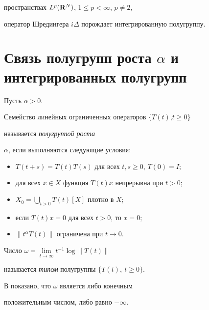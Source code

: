 пространствах $L^p(\bold R^N)$, $1\leq p< \infty$, $p\ne2$,


оператор Шредингера $i\Delta$ порождает интегрированную полугруппу.





\section{Связь полугрупп роста $\alpha$ и интегрированных полугрупп}





\begin{defn}\label{15}


Пусть $\alpha > 0$.


Семейство линейных ограниченных операторов $\{T(t)$,\linebreak $t\geq0 \}$


называется {\it полугруппой роста}


$\alpha$, если выполняются следующие условия:


\begin{itemize}


\item[(T1)] $T(t+s)=T(t)T(s)$ для всех $t,s \geq 0$, $T(0)=I;$ 


\item[(T2)] для всех $x\in X$ функция $T(t)x$ непрерывна при $t>0$;


\item[(T3)] $X_0=\bigcup\limits_{t > 0}T(t)[X]$ плотно в $X$; 


\item[(T4)] если $T(t)x=0$ для всех $t>0$, то $x=0$;


\item[(T5)] $\|t^{\alpha}T(t)\|$ ограничена  при $t\to 0$.


\end{itemize}


\end{defn}





Число $\omega=\lim\limits_{t\to \infty}t^{-1}\log \|T(t)\|$ 


называется {\it типом} полугруппы $\{T(t),\ t\geq0 \}$. 


В \cite{Fillips} показано, что $\omega$ является либо конечным 


положительным числом, либо равно $-\infty$.






